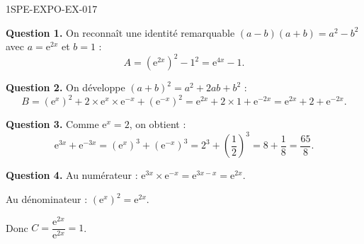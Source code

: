 \begin{corrige}{1SPE-EXPO-EX-017}

\textbf{Question 1.} On reconnaît une identité remarquable $(a-b)(a+b) = a^2 - b^2$ avec $a = \mathrm{e}^{2x}$ et $b = 1$ :
\[
A = \left(\mathrm{e}^{2x}\right)^2 - 1^2 = \mathrm{e}^{4x} - 1.
\]

\textbf{Question 2.} On développe $(a+b)^2 = a^2 + 2ab + b^2$ :
\[
B = \left(\mathrm{e}^x\right)^2 + 2 \times \mathrm{e}^x \times \mathrm{e}^{-x} + \left(\mathrm{e}^{-x}\right)^2 = \mathrm{e}^{2x} + 2 \times 1 + \mathrm{e}^{-2x} = \mathrm{e}^{2x} + 2 + \mathrm{e}^{-2x}.
\]

\textbf{Question 3.} Comme $\mathrm{e}^x = 2$, on obtient :
\[
\mathrm{e}^{3x} + \mathrm{e}^{-3x} = \left(\mathrm{e}^x\right)^3 + \left(\mathrm{e}^{-x}\right)^3 = 2^3 + \left(\frac{1}{2}\right)^3 = 8 + \frac{1}{8} = \frac{65}{8}.
\]

\textbf{Question 4.} Au numérateur : $\mathrm{e}^{3x} \times \mathrm{e}^{-x} = \mathrm{e}^{3x-x} = \mathrm{e}^{2x}$.

Au dénominateur : $\left(\mathrm{e}^x\right)^2 = \mathrm{e}^{2x}$.

Donc $C = \dfrac{\mathrm{e}^{2x}}{\mathrm{e}^{2x}} = 1$.
\end{corrige}
